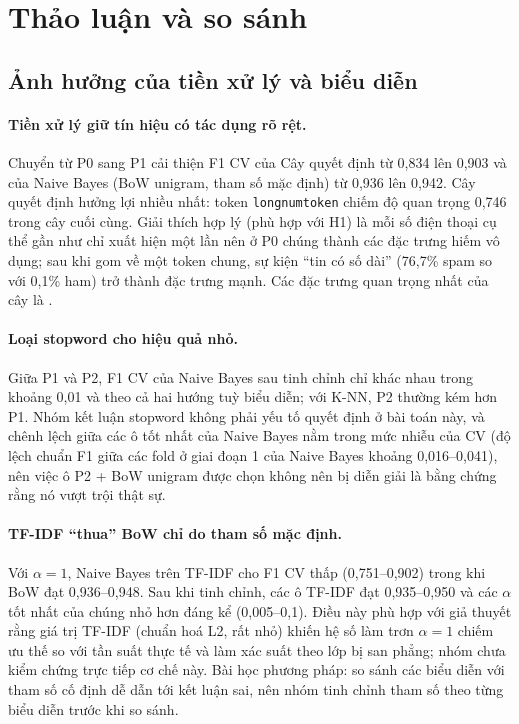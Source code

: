 \documentclass[12pt,a4paper]{article}
\begin{document}
\section{Thảo luận và so sánh}\label{sec:disc}
\subsection{Ảnh hưởng của tiền xử lý và biểu diễn}
\paragraph{Tiền xử lý giữ tín hiệu có tác dụng rõ rệt.} Chuyển từ P0 sang P1 cải thiện F1 CV của Cây quyết định từ 0,834 lên 0,903 và của Naive Bayes (BoW unigram, tham số mặc định) từ 0,936 lên 0,942. Cây quyết định hưởng lợi nhiều nhất: token \texttt{longnumtoken} chiếm độ quan trọng 0,746 trong cây cuối cùng. Giải thích hợp lý (phù hợp với H1) là mỗi số điện thoại cụ thể gần như chỉ xuất hiện một lần nên ở P0 chúng thành các đặc trưng hiếm vô dụng; sau khi gom về một token chung, sự kiện ``tin có số dài'' (76,7\% spam so với 0,1\% ham) trở thành đặc trưng mạnh. Các đặc trưng quan trọng nhất của cây là \DTtop.

\paragraph{Loại stopword cho hiệu quả nhỏ.} Giữa P1 và P2, F1 CV của Naive Bayes sau tinh chỉnh chỉ khác nhau trong khoảng 0,01 và theo cả hai hướng tuỳ biểu diễn; với K-NN, P2 thường kém hơn P1. Nhóm kết luận stopword không phải yếu tố quyết định ở bài toán này, và chênh lệch giữa các ô tốt nhất của Naive Bayes nằm trong mức nhiễu của CV (độ lệch chuẩn F1 giữa các fold ở giai đoạn 1 của Naive Bayes khoảng 0,016--0,041), nên việc ô P2 + BoW unigram được chọn không nên bị diễn giải là bằng chứng rằng nó vượt trội thật sự.

\paragraph{TF-IDF ``thua'' BoW chỉ do tham số mặc định.} Với $\alpha=1$, Naive Bayes trên TF-IDF cho F1 CV thấp (0,751--0,902) trong khi BoW đạt 0,936--0,948. Sau khi tinh chỉnh, các ô TF-IDF đạt 0,935--0,950 và các $\alpha$ tốt nhất của chúng nhỏ hơn đáng kể (0,005--0,1). Điều này phù hợp với giả thuyết rằng giá trị TF-IDF (chuẩn hoá L2, rất nhỏ) khiến hệ số làm trơn $\alpha=1$ chiếm ưu thế so với tần suất thực tế và làm xác suất theo lớp bị san phẳng; nhóm chưa kiểm chứng trực tiếp cơ chế này. Bài học phương pháp: so sánh các biểu diễn với tham số cố định dễ dẫn tới kết luận sai, nên nhóm tinh chỉnh tham số theo từng biểu diễn trước khi so sánh.
\end{document}
